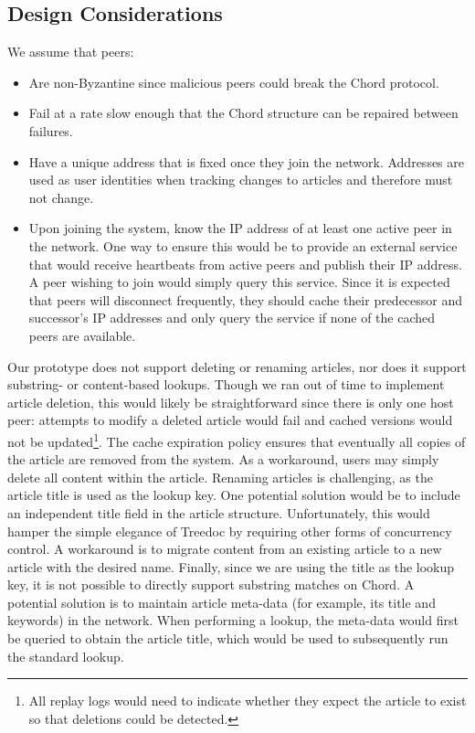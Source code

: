 \documentclass[twocolumn]{article}
\begin{document}
\subsection{Design Considerations}
We assume that peers:
\begin{itemize}
  \item Are non-Byzantine since malicious peers could break the Chord protocol.
  \item Fail at a rate slow enough that the Chord structure can be repaired between failures.
  \item Have a unique address that is fixed once they join the network. Addresses are used as user identities when tracking changes to articles and therefore must not change.
  \item Upon joining the system, know the IP address of at least one active peer in the network. One way to ensure this would be to provide an external service that would receive heartbeats from active peers and publish their IP address. A peer wishing to join would simply query this service. Since it is expected that peers will disconnect frequently, they should cache their predecessor and successor's IP addresses and only query the service if none of the cached peers are available.
\end{itemize}

Our prototype does not support deleting or renaming articles, nor does it support substring- or content-based lookups. Though we ran out of time to implement article deletion, this would likely be straightforward since there is only one host peer: attempts to modify a deleted article would fail and cached versions would not be updated\footnote{All replay logs would need to indicate whether they expect the article to exist so that deletions could be detected.}. The cache expiration policy ensures that eventually all copies of the article are removed from the system. As a workaround, users may simply delete all content within the article. Renaming articles is challenging, as the article title is used as the lookup key. One potential solution would be to include an independent title field in the article structure. Unfortunately, this would hamper the simple elegance of Treedoc by requiring other forms of concurrency control. A workaround is to migrate content from an existing article to a new article with the desired name. Finally, since we are using the title as the lookup key, it is not possible to directly support substring matches on Chord. A potential solution is to maintain article meta-data (for example, its title and keywords) in the network. When performing a lookup, the meta-data would first be queried to obtain the article title, which would be used to subsequently run the standard lookup.
\end{document}
